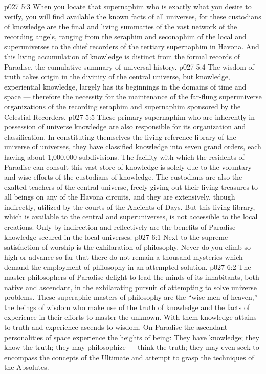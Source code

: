 \vs p027 5:3 When you locate that supernaphim who is exactly what you desire to verify, you will find available  the known facts of all universes, for these custodians of knowledge are the final and living summaries of the vast network of the recording angels, ranging from the seraphim and seconaphim of the local and superuniverses to the chief recorders of the tertiary supernaphim in Havona. And this living accumulation of knowledge is distinct from the formal records of Paradise, the cumulative summary of universal history.
\vs p027 5:4 The wisdom of truth takes origin in the divinity of the central universe, but knowledge, experiential knowledge, largely has its beginnings in the domains of time and space --- therefore the necessity for the maintenance of the far\hyp{}flung superuniverse organizations of the recording seraphim and supernaphim sponsored by the Celestial Recorders.
\vs p027 5:5 These primary supernaphim who are inherently in possession of universe knowledge are also responsible for its organization and classification. In constituting themselves the living reference library of the universe of universes, they have classified knowledge into seven grand orders, each having about 1,000,000 subdivisions. The facility with which the residents of Paradise can consult this vast store of knowledge is solely due to the voluntary and wise efforts of the custodians of knowledge. The custodians are also the exalted teachers of the central universe, freely giving out their living treasures to all beings on any of the Havona circuits, and they are extensively, though indirectly, utilized by the courts of the Ancients of Days. But this living library, which is available to the central and superuniverses, is not accessible to the local creations. Only by indirection and reflectively are the benefits of Paradise knowledge secured in the local universes.
\vs p027 6:1 Next to the supreme satisfaction of worship is the exhilaration of philosophy. Never do you climb so high or advance so far that there do not remain a thousand mysteries which demand the employment of philosophy in an attempted solution.
\vs p027 6:2 The master philosophers of Paradise delight to lead the minds of its inhabitants, both native and ascendant, in the exhilarating pursuit of attempting to solve universe problems. These superaphic masters of philosophy are the “wise men of heaven,” the beings of wisdom who make use of the truth of knowledge and the facts of experience in their efforts to master the unknown. With them knowledge attains to truth and experience ascends to wisdom. On Paradise the ascendant personalities of space experience the heights of being: They have knowledge; they know the truth; they may philosophize --- think the truth; they may even seek to encompass the concepts of the Ultimate and attempt to grasp the techniques of the Absolutes.
